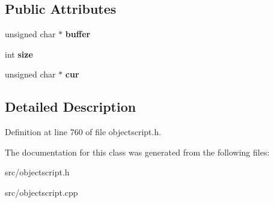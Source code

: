 \subsection*{Public Attributes}
\begin{DoxyCompactItemize}
\item 
unsigned char $\ast$ {\bfseries buffer}\hypertarget{class_object_script_1_1_o_s_1_1_core_1_1_mem_stream_reader_a290312140f02f0d274e687b734cc0438}{}\label{class_object_script_1_1_o_s_1_1_core_1_1_mem_stream_reader_a290312140f02f0d274e687b734cc0438}

\item 
int {\bfseries size}\hypertarget{class_object_script_1_1_o_s_1_1_core_1_1_mem_stream_reader_a83bfc484853c7846ac3faf8273721da5}{}\label{class_object_script_1_1_o_s_1_1_core_1_1_mem_stream_reader_a83bfc484853c7846ac3faf8273721da5}

\item 
unsigned char $\ast$ {\bfseries cur}\hypertarget{class_object_script_1_1_o_s_1_1_core_1_1_mem_stream_reader_a2b10bf65317ccfd380db7ea90c544a74}{}\label{class_object_script_1_1_o_s_1_1_core_1_1_mem_stream_reader_a2b10bf65317ccfd380db7ea90c544a74}

\end{DoxyCompactItemize}


\subsection{Detailed Description}


Definition at line 760 of file objectscript.\+h.



The documentation for this class was generated from the following files\+:\begin{DoxyCompactItemize}
\item 
src/objectscript.\+h\item 
src/objectscript.\+cpp\end{DoxyCompactItemize}

